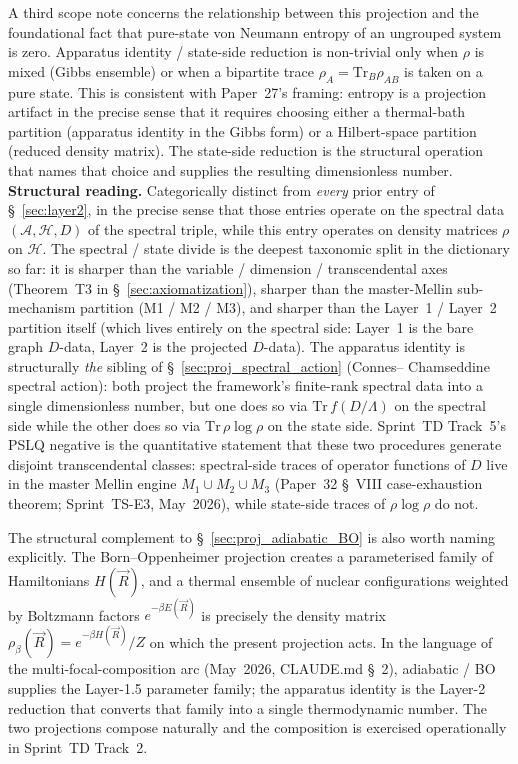 A third scope note concerns the relationship between this projection
and the foundational fact that pure-state von Neumann entropy of an
ungrouped system is zero.  Apparatus identity / state-side reduction
is non-trivial only when $\rho$ is mixed (Gibbs ensemble) or when a
bipartite trace $\rho_A = \mathrm{Tr}_B \rho_{AB}$ is taken on a pure
state.  This is consistent with Paper~27's framing: entropy is a
projection artifact in the precise sense that it requires choosing
either a thermal-bath partition (apparatus identity in the Gibbs
form) or a Hilbert-space partition (reduced density matrix).  The
state-side reduction is the structural operation that names that
choice and supplies the resulting dimensionless number.\\
\textbf{Structural reading.}  Categorically distinct from
\emph{every} prior entry of \S~\ref{sec:layer2}, in the precise
sense that those entries operate on the spectral data $(\mathcal{A},
\mathcal{H}, D)$ of the spectral triple, while this entry operates
on density matrices $\rho$ on $\mathcal{H}$.  The spectral / state
divide is the deepest taxonomic split in the dictionary so far: it
is sharper than the variable / dimension / transcendental axes
(Theorem~T3 in \S~\ref{sec:axiomatization}), sharper than
the master-Mellin sub-mechanism partition (M1 / M2 / M3), and sharper
than the Layer~1 / Layer~2 partition itself (which lives entirely on
the spectral side: Layer~1 is the bare graph $D$-data, Layer~2 is the
projected $D$-data).  The apparatus identity is structurally
\emph{the} sibling of \S~\ref{sec:proj_spectral_action} (Connes--%
Chamseddine spectral action): both project the framework's
finite-rank spectral data into a single dimensionless number, but
one does so via $\mathrm{Tr}\,f(D/\Lambda)$ on the spectral side
while the other does so via $\mathrm{Tr}\,\rho\log\rho$ on the
state side.  Sprint~TD Track~5's PSLQ negative is the quantitative
statement that these two procedures generate disjoint transcendental
classes: spectral-side traces of operator functions of $D$ live in
the master Mellin engine $M_1 \cup M_2 \cup M_3$ (Paper~32
\S~VIII case-exhaustion theorem; Sprint~TS-E3, May~2026), while
state-side traces of $\rho \log \rho$ do not.

The structural complement to \S~\ref{sec:proj_adiabatic_BO} is also
worth naming explicitly.  The Born--Oppenheimer projection creates a
parameterised family of Hamiltonians $H(\vec{R})$, and a thermal
ensemble of nuclear configurations weighted by Boltzmann factors
$e^{-\beta E(\vec{R})}$ is precisely the density matrix
$\rho_\beta(\vec{R}) = e^{-\beta H(\vec{R})}/Z$ on which the present
projection acts.  In the language of the multi-focal-composition arc
(May~2026, CLAUDE.md \S~2), adiabatic / BO supplies the Layer-1.5
parameter family; the apparatus identity is the Layer-2 reduction
that converts that family into a single thermodynamic number.  The
two projections compose naturally and the composition is exercised
operationally in Sprint~TD Track~2.

